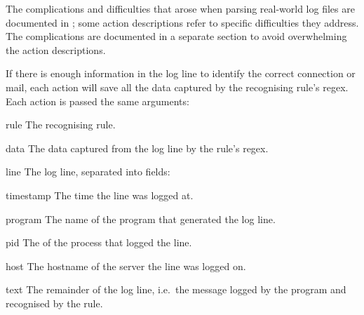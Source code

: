 The complications and difficulties that arose when parsing real-world log
files are documented in ; some action
descriptions refer to specific difficulties they address.  The
complications are documented in a separate section to avoid overwhelming
the action descriptions.

If there is enough information in the log line to identify the correct
connection or mail, each action will save all the data captured by the
recognising rule's regex.  Each action is passed the same arguments:

\begin{boldeqlist}

    \squeezeitems{}

    \item [rule] The recognising rule.

    \item [data] The data captured from the log line by the rule's regex.

    \item [line] The log line, separated into fields:

        \begin{boldeqlist}

            \squeezeitems{}

            \item [timestamp] The time the line was logged at.

            \item [program] The name of the program that generated the log
                line.

            \item [pid] The  of the process that logged the
                line.

            \item [host] The hostname of the server the line was logged on.

            \item [text] The remainder of the log line, i.e.\ the message
                logged by the program and recognised by the rule.

        \end{boldeqlist}

\end{boldeqlist}

